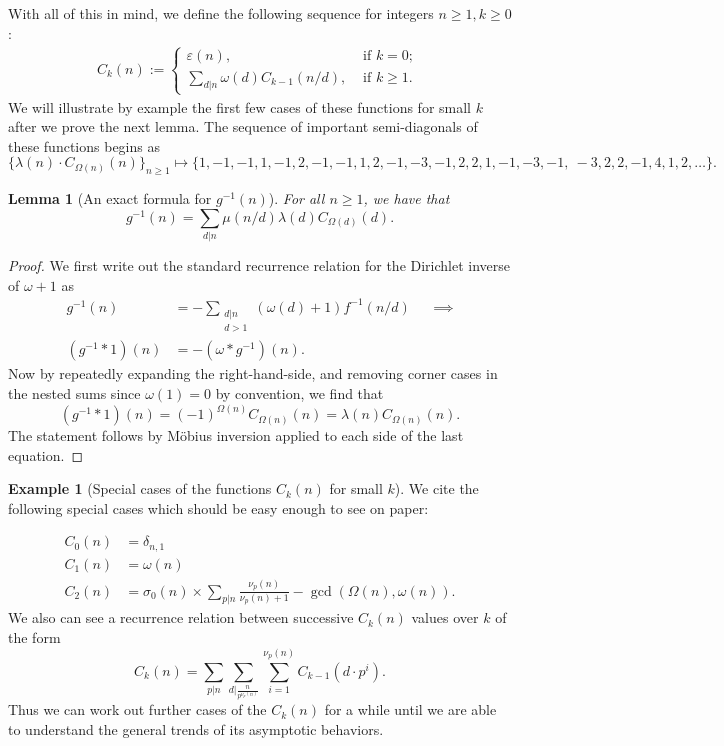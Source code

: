 \documentclass[11pt,reqno,a4letter]{article}
\numberwithin{figure}{section}
\numberwithin{table}{section}
\newcommand{\seqnum}[1]{\href{http://oeis.org/#1}{\color{ProcessBlue}{\underline{#1}}}}
\theoremstyle{plain}
\newtheorem{lemma}[theorem]{Lemma}
\numberwithin{theorem}{section}
\theoremstyle{definition}
\newtheorem{example}[theorem]{Example}
\newcommand{\NBRef}[1]{
     \todo[linecolor=green!85!white,backgroundcolor=orange!50!white,bordercolor=blue!30!black,textcolor=cyan!15!black,shadow,size=\small,fancyline]{
     \color{NBRefColor}{\textbf{#1}
     }
     }
}
\begin{document}
With all of this in mind, we define the following sequence for integers $n \geq 1, k \geq 0$: 
\begin{align} 
C_k(n) := \begin{cases} 
     \varepsilon(n), & \text{ if $k = 0$; } \\ 
     \sum\limits_{d|n} \omega(d) C_{k-1}(n/d), & \text{ if $k \geq 1$. } 
     \end{cases} 
\end{align} 
We will illustrate by example the first few cases of these functions for small $k$ after we prove 
the next lemma. 
The sequence of important semi-diagonals of these functions begins as 
\cite[\seqnum{A008480}]{OEIS} 
\[
\{\lambda(n) \cdot C_{\Omega(n)}(n) \}_{n \geq 1} \mapsto \{
     1, -1, -1, 1, -1, 2, -1, -1, 1, 2, -1, -3, -1, 2, 2, 1, -1, -3, -1, \
     -3, 2, 2, -1, 4, 1, 2, \ldots \}. 
\]

\begin{lemma}[An exact formula for $g^{-1}(n)$] 
\label{lemma_AnExactFormulaFor_gInvByMobiusInv_v1} 
For all $n \geq 1$, we have that 
\[
g^{-1}(n) = \sum_{d|n} \mu(n/d) \lambda(d) C_{\Omega(d)}(d). 
\]
\end{lemma}
\begin{proof} 
We first write out the standard recurrence relation for the Dirichlet inverse of 
$\omega+1$ as 
\begin{align*} 
g^{-1}(n) & = - \sum_{\substack{d|n \\ d>1}} (\omega(d) + 1) f^{-1}(n/d) && \implies \\ 
     (g^{-1} \ast 1)(n) & = -(\omega \ast g^{-1})(n). 
\end{align*} 
Now by repeatedly expanding the right-hand-side, and removing corner cases in the nested sums since 
$\omega(1) = 0$ by convention, we find that 
\[
(g^{-1} \ast 1)(n) = (-1)^{\Omega(n)} C_{\Omega(n)}(n) = \lambda(n) C_{\Omega(n)}(n). 
\]
The statement follows by M\"obius inversion applied to each side of the last equation. 
\end{proof}

\begin{example}[Special cases of the functions $C_k(n)$ for small $k$] 
\label{example_SpCase_Ckn} 
We cite the following special cases which should be easy enough to see on paper: 
\NBRef{A07-2020-04-26} 
\begin{align*} 
C_0(n) & = \delta_{n,1} \\ 
C_1(n) & = \omega(n) \\ 
C_2(n) & = \sigma_0(n) \times \sum_{p|n} \frac{\nu_p(n)}{\nu_p(n)+1} - \gcd\left(\Omega(n), \omega(n)\right). 
\end{align*} 
We also can see a recurrence relation between successive $C_k(n)$ values over $k$ of the form 
\begin{equation}
\label{eqn_Ckn_recFormula_v1} 
C_k(n) = \sum_{p|n} \sum_{d\rvert\frac{n}{p^{\nu_p(n)}}} \sum_{i=1}^{\nu_p(n)} C_{k-1}\left(d \cdot p^i\right). 
\end{equation}
Thus we can work out further cases of the $C_k(n)$ for a while until we are able to understand the 
general trends of its asymptotic behaviors. 
\end{example} 
\end{document}
